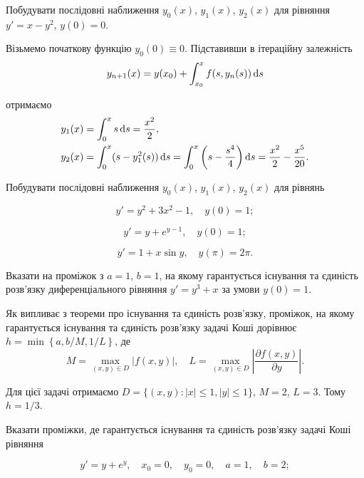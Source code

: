 \setcounter{problem}{0}
\begin{example}
	Побудувати послідовні наближення $y_0(x)$, $y_1(x)$, $y_2(x)$ для рівняння $y' = x - y^2$, $y(0) = 0$.
\end{example}

\begin{solution}
	Візьмемо початкову функцію $y_0(0) \equiv 0$. Підставивши в ітераційну залежність \[ y_{n+1} (x) = y(x_0) + \int_{x_0}^x f(s, y_n(s)) \mathop{}\!\mathrm{d} s \] 

	отримаємо 
	\begin{align*} 
		y_1(x) &= \int_0^x s \mathop{}\!\mathrm{d} s = \frac{x^2}{2}, \\
		y_2(x) &= \int_0^x (s - y_1^2(s)) \mathop{}\!\mathrm{d} s = \int_0^x \left(s - \frac{s^4}{4}\right) \mathop{}\!\mathrm{d} s = \frac{x^2}{2} - \frac{x^5}{20}.
	\end{align*}
\end{solution}

Побудувати послідовні наближення $y_0(x)$, $y_1(x)$, $y_2(x)$ для рівнянь
\begin{problem}
	\[y' = y^2 + 3x^2 - 1, \quad y(0) = 1;\]
\end{problem}

\begin{problem}
	\[y'=y+e^{y-1},\quad y(0)=1;\]
\end{problem}

\begin{problem}
	\[y'=1+x\sin y, \quad y(\pi)=2\pi.\]
\end{problem}

\begin{example}
	Вказати на проміжок з $a=1$, $b=1$, на якому гарантується існування та єдиність розв'язку диференціального рівняння $y'=y^3+x$ за умови $y(0)=1$.
\end{example}

\begin{solution}
	Як випливає з теореми про існування та єдиність розв'язку, проміжок, на якому гарантується існування та єдиність розв'язку задачі Коші дорівнює $h = \min \left\{ a, b/M, 1/L\right\}$, де \[ M = \max_{(x,y)\in D} |f(x,y)|, \quad L = \max_{(x,y)\in D} \left|\frac{\partial f(x,y)}{\partial y}\right|.\]

	Для цієї задачі отримаємо $D = \{ (x,y): |x| \le 1, |y| \le 1\}$, $M=2$, $L=3$. Тому $h = 1/3$.
\end{solution}	

Вказати проміжки, де гарантується існування та єдиність розв'язку задачі Коші рівняння
\begin{problem}
	\[y'=y+e^y,\quad x_0=0, \quad y_0=0,\quad a=1,\quad b=2;\]
\end{problem}

